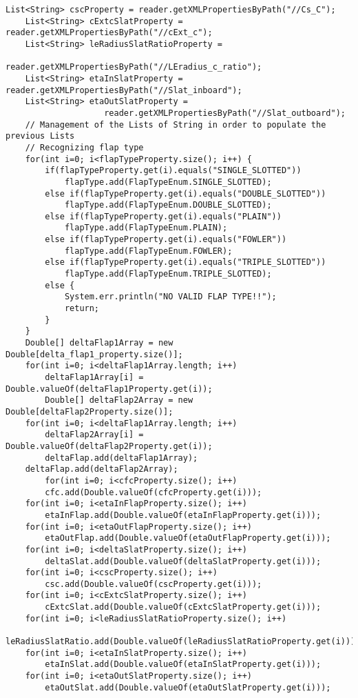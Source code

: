 \begin{lstlisting}[caption={Excerpt of B747-100B test - Input data reading}, captionpos=b, tabsize=2]
	List<String> cscProperty = reader.getXMLPropertiesByPath("//Cs_C");
	List<String> cExtcSlatProperty = reader.getXMLPropertiesByPath("//cExt_c");
	List<String> leRadiusSlatRatioProperty = 
					reader.getXMLPropertiesByPath("//LEradius_c_ratio");
	List<String> etaInSlatProperty = reader.getXMLPropertiesByPath("//Slat_inboard");
	List<String> etaOutSlatProperty = 
					reader.getXMLPropertiesByPath("//Slat_outboard");
	// Management of the Lists of String in order to populate the previous Lists  
	// Recognizing flap type
	for(int i=0; i<flapTypeProperty.size(); i++) {
		if(flapTypeProperty.get(i).equals("SINGLE_SLOTTED"))
			flapType.add(FlapTypeEnum.SINGLE_SLOTTED);
		else if(flapTypeProperty.get(i).equals("DOUBLE_SLOTTED"))
			flapType.add(FlapTypeEnum.DOUBLE_SLOTTED);
		else if(flapTypeProperty.get(i).equals("PLAIN"))
			flapType.add(FlapTypeEnum.PLAIN);
		else if(flapTypeProperty.get(i).equals("FOWLER"))
			flapType.add(FlapTypeEnum.FOWLER);
		else if(flapTypeProperty.get(i).equals("TRIPLE_SLOTTED"))
			flapType.add(FlapTypeEnum.TRIPLE_SLOTTED);
		else {
			System.err.println("NO VALID FLAP TYPE!!");
			return;
		}
	}
	Double[] deltaFlap1Array = new Double[delta_flap1_property.size()];
	for(int i=0; i<deltaFlap1Array.length; i++)
		deltaFlap1Array[i] = Double.valueOf(deltaFlap1Property.get(i));
		Double[] deltaFlap2Array = new Double[deltaFlap2Property.size()];
	for(int i=0; i<deltaFlap1Array.length; i++)
		deltaFlap2Array[i] = Double.valueOf(deltaFlap2Property.get(i));
		deltaFlap.add(deltaFlap1Array);
	deltaFlap.add(deltaFlap2Array);
		for(int i=0; i<cfcProperty.size(); i++)
		cfc.add(Double.valueOf(cfcProperty.get(i)));
	for(int i=0; i<etaInFlapProperty.size(); i++)
		etaInFlap.add(Double.valueOf(etaInFlapProperty.get(i)));
	for(int i=0; i<etaOutFlapProperty.size(); i++)
		etaOutFlap.add(Double.valueOf(etaOutFlapProperty.get(i)));
	for(int i=0; i<deltaSlatProperty.size(); i++)
		deltaSlat.add(Double.valueOf(deltaSlatProperty.get(i)));
	for(int i=0; i<cscProperty.size(); i++)
		csc.add(Double.valueOf(cscProperty.get(i)));
	for(int i=0; i<cExtcSlatProperty.size(); i++)
		cExtcSlat.add(Double.valueOf(cExtcSlatProperty.get(i)));
	for(int i=0; i<leRadiusSlatRatioProperty.size(); i++)
		leRadiusSlatRatio.add(Double.valueOf(leRadiusSlatRatioProperty.get(i)));
	for(int i=0; i<etaInSlatProperty.size(); i++)
		etaInSlat.add(Double.valueOf(etaInSlatProperty.get(i)));
	for(int i=0; i<etaOutSlatProperty.size(); i++)
		etaOutSlat.add(Double.valueOf(etaOutSlatProperty.get(i)));
\end{lstlisting}

